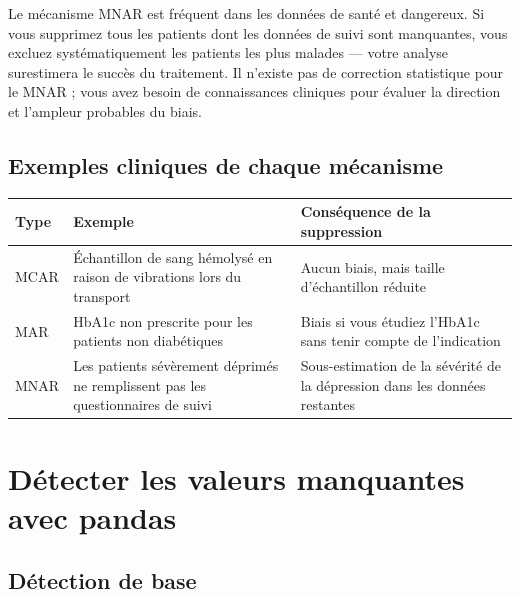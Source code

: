 \begin{warningbox}
Le m\'ecanisme MNAR est fr\'equent dans les donn\'ees de sant\'e et dangereux. Si vous supprimez tous les patients dont les donn\'ees de suivi sont manquantes, vous excluez syst\'ematiquement les patients les plus malades --- votre analyse surestimera le succ\`es du traitement. Il n'existe pas de correction statistique pour le MNAR ; vous avez besoin de connaissances cliniques pour \'evaluer la direction et l'ampleur probables du biais.
\end{warningbox}

\subsection{Exemples cliniques de chaque m\'ecanisme}

\begin{center}
\begin{tabular}{lp{5cm}p{5cm}}
\toprule
\textbf{Type} & \textbf{Exemple} & \textbf{Cons\'equence de la suppression} \\
\midrule
MCAR & \'Echantillon de sang h\'emolys\'e en raison de vibrations lors du transport & Aucun biais, mais taille d'\'echantillon r\'eduite \\
MAR & HbA1c non prescrite pour les patients non diab\'etiques & Biais si vous \'etudiez l'HbA1c sans tenir compte de l'indication \\
MNAR & Les patients s\'ev\`erement d\'eprim\'es ne remplissent pas les questionnaires de suivi & Sous-estimation de la s\'ev\'erit\'e de la d\'epression dans les donn\'ees restantes \\
\bottomrule
\end{tabular}
\end{center}

\section{D\'etecter les valeurs manquantes avec pandas}

\subsection{D\'etection de base}

